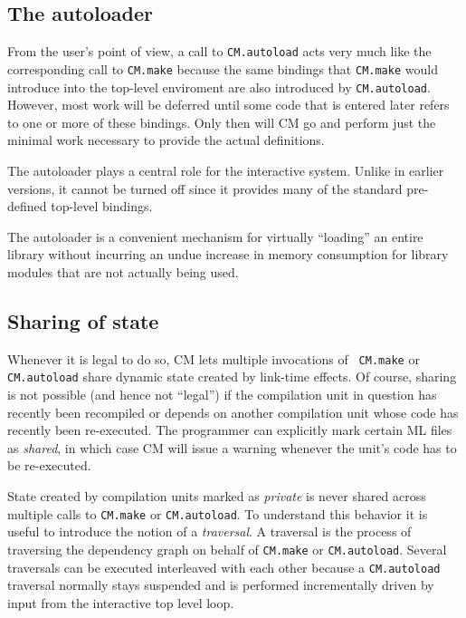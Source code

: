 \documentclass{article}
\begin{document}
\subsection{The autoloader}
\label{sec:autoload}

From the user's point of view, a call to {\tt CM.autoload} acts very
much like the corresponding call to {\tt CM.make} because the same
bindings that {\tt CM.make} would introduce into the top-level
enviroment are also introduced by {\tt CM.autoload}.  However, most
work will be deferred until some code that is entered later refers to
one or more of these bindings.  Only then will CM go and perform just
the minimal work necessary to provide the actual definitions.

The autoloader plays a central role for the interactive system.
Unlike in earlier versions, it cannot be turned off since it provides
many of the standard pre-defined top-level bindings.

The autoloader is a convenient mechanism for virtually ``loading'' an
entire library without incurring an undue increase in memory
consumption for library modules that are not actually being used.

\subsection{Sharing of state}
\label{sec:sharing}

Whenever it is legal to do so, CM lets multiple invocations of {\tt
CM.make} or {\tt CM.autoload} share dynamic state created by link-time
effects.  Of course, sharing is not possible (and hence not ``legal'')
if the compilation unit in question has recently been recompiled or
depends on another compilation unit whose code has recently been
re-executed.  The programmer can explicitly mark certain ML files as
{\em shared}, in which case CM will issue a warning whenever the
unit's code has to be re-executed.

State created by compilation units marked as {\em private} is never
shared across multiple calls to {\tt CM.make} or {\tt CM.autoload}.
To understand this behavior it is useful to introduce the notion of a
{\em traversal}.  A traversal is the process of traversing the
dependency graph on behalf of {\tt CM.make} or {\tt CM.autoload}.
Several traversals can be executed interleaved with each other because
a {\tt CM.autoload} traversal normally stays suspended and is
performed incrementally driven by input from the interactive top level
loop.
\end{document}
